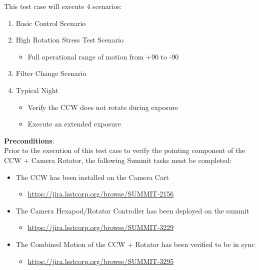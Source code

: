 \documentclass[SE,lsstdraft,STR,toc]{lsstdoc}
\providecommand{\tightlist}{
  \setlength{\itemsep}{0pt}\setlength{\parskip}{0pt}}
\begin{document}
This test case will execute 4 scenarios:

\begin{enumerate}
\tightlist
\item
  Basic Control Scenario
\item
  High Rotation Stress Test Scenario

  \begin{itemize}
  \tightlist
  \item
    Full operational range of motion from +90 to -90
  \end{itemize}
\item
  Filter Change Scenario
\item
  Typical Night

  \begin{itemize}
  \tightlist
  \item
    Verify the CCW does not rotate during exposure
  \item
    Execute an extended exposure
  \end{itemize}
\end{enumerate}


\textbf{ Preconditions}:\\
Prior to the execution of this test case to verify the pointing
component of the CCW + Camera Rotator, the following Summit tasks must
be completed:

\begin{itemize}
\tightlist
\item
  The CCW has been installed on the Camera Cart

  \begin{itemize}
  \tightlist
  \item
    \url{https://jira.lsstcorp.org/browse/SUMMIT-2156}
  \end{itemize}
\item
  The Camera Hexapod/Rotator Controller has been deployed on the summit

  \begin{itemize}
  \tightlist
  \item
    \url{https://jira.lsstcorp.org/browse/SUMMIT-3229}
  \end{itemize}
\item
  The Combined Motion of the CCW + Rotator has been verified to be in
  sync

  \begin{itemize}
  \tightlist
  \item
    \url{https://jira.lsstcorp.org/browse/SUMMIT-3295}
  \end{itemize}
\end{itemize}
\end{document}
